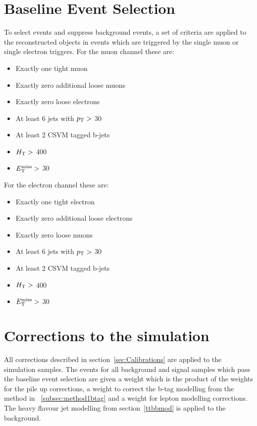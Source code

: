 \section{Baseline Event Selection}
\label{sec:baseline}
To select \tttt events and suppress background events, a set of criteria are applied to the reconstructed objects in events which are triggered by the single muon or single electron triggers.
For the muon channel these are:
\begin{itemize}
\setlength\itemsep{0em}
\item Exactly one tight muon
\item Exactly zero additional loose muons
\item Exactly zero loose electrons
\item At least 6 jets with $p_{\mathrm{T}} >$ 30 \GeV
\item At least 2 CSVM tagged b-jets
\item $H_{\mathrm{T}} > $ 400 \GeV 
\item $E_{\mathrm{T}}^{\text{miss}} > $ 30 \GeV 
\end{itemize}
For the electron channel these are:
\begin{itemize}
\itemsep0em 
\item Exactly one tight electron
\item Exactly zero additional loose electrons
\item Exactly zero loose muons
\item At least 6 jets with $p_{\mathrm{T}} >$ 30 \GeV
\item At least 2 CSVM tagged b-jets
\item $H_{\mathrm{T}} > $ 400 \GeV 
\item $E_{\mathrm{T}}^{\text{miss}} > $ 30 \GeV 
\end{itemize}

\section{Corrections to the simulation}
\label{sec:Calibrations8}
All corrections described in section~\ref{sec:Calibrations} are applied to the simulation samples.
The events for all background and signal samples which pass the baseline event selection are given a weight which is the product of the weights for the pile up corrections, a weight to correct the b-tag modelling from the method in ~\ref{subsec:method1btag} and a weight for lepton modelling corrections. The heavy flavour jet modelling from section~\ref{ttbbmod} is applied to the \ttbar background.



